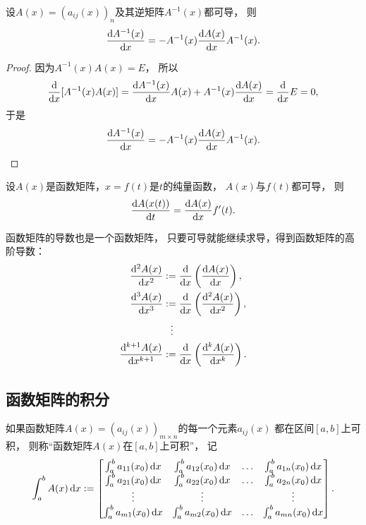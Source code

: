 \begin{property}
设\(A(x) = (a_{ij}(x))_n\)及其逆矩阵\(A^{-1}(x)\)都可导，
则\begin{equation*}
	\dv{A^{-1}(x)}{x}
	= - A^{-1}(x)
	\dv{A(x)}{x}
	A^{-1}(x).
\end{equation*}
\begin{proof}
因为\(A^{-1}(x) A(x) = E\)，
所以\begin{equation*}
	\dv{x} [ A^{-1}(x) A(x) ]
	= \dv{A^{-1}(x)}{x} A(x)
	+ A^{-1}(x) \dv{A(x)}{x}
	= \dv{x} E
	= 0,
\end{equation*}
于是\begin{equation*}
	\dv{A^{-1}(x)}{x}
	= - A^{-1}(x)
	\dv{A(x)}{x}
	A^{-1}(x).
	\qedhere
\end{equation*}
\end{proof}
\end{property}

\begin{property}
设\(A(x)\)是函数矩阵，\(x = f(t)\)是\(t\)的纯量函数，
\(A(x)\)与\(f(t)\)都可导，
则\begin{equation*}
	\dv{A(x(t))}{t}
	= \dv{A(x)}{x} f'(t).
\end{equation*}
\end{property}

函数矩阵的导数也是一个函数矩阵，
只要可导就能继续求导，得到函数矩阵的高阶导数：
\begin{align*}
	\dv[2]{A(x)}{x}
	&:= \dv{x}\left( \dv{A(x)}{x} \right), \\
	\dv[3]{A(x)}{x}
	&:= \dv{x}\left( \dv[2]{A(x)}{x} \right), \\
	&\hspace{6pt}\vdots \\
	\dv[k+1]{A(x)}{x}
	&:= \dv{x}\left( \dv[k]{A(x)}{x} \right).
\end{align*}

\subsection{函数矩阵的积分}
\begin{definition}
如果函数矩阵\(A(x) = (a_{ij}(x))_{m \times n}\)的每一个元素\(a_{ij}(x)\)
都在区间\([a,b]\)上可积，
则称“函数矩阵\(A(x)\)在\([a,b]\)上可积”，
记\begin{equation*}
	\int_a^b A(x) \dd{x}
	:=
	\begin{bmatrix}
		\int_a^b a_{11}(x_0) \dd{x} & \int_a^b a_{12}(x_0) \dd{x} & \dots & \int_a^b a_{1n}(x_0) \dd{x} \\
		\int_a^b a_{21}(x_0) \dd{x} & \int_a^b a_{22}(x_0) \dd{x} & \dots & \int_a^b a_{2n}(x_0) \dd{x} \\
		\vdots & \vdots & & \vdots \\
		\int_a^b a_{m1}(x_0) \dd{x} & \int_a^b a_{m2}(x_0) \dd{x} & \dots & \int_a^b a_{mn}(x_0) \dd{x} \\
	\end{bmatrix}.
\end{equation*}
\end{definition}

